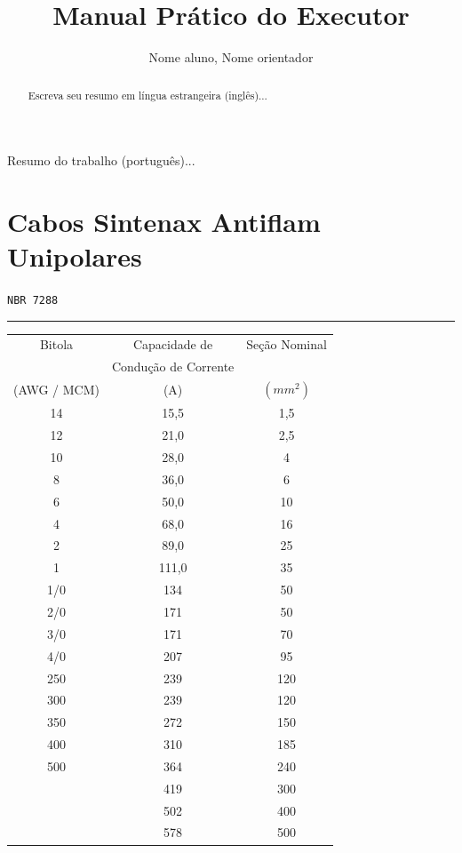\documentclass[12pt]{article}
\title{Manual Prático do Executor} %
\author{Nome aluno\inst{1}, Nome orientador\inst{1}} %
\begin{document}
\maketitle %

\begin{abstract} %
  Escreva seu resumo em língua estrangeira (inglês)...
\end{abstract}
     
\begin{resumo}
  Resumo do trabalho (português)...  
\end{resumo}
\selectfont
\section{Cabos Sintenax Antiflam Unipolares }

\begin{minipage}[t]{\linewidth}\color{blue}
	\centering
	\noindent
	\texttt{NBR 7288}
\end{minipage}
\rule{\linewidth}{.1em}\par
\noindent
\begin{tabular}{|c|c|c|}
	\hline
	Bitola & Capacidade de  & Seção Nominal \\
	 & Condução de Corrente & \\
	(AWG / MCM) & (A) & $(mm^{2})$ \\
	\hline
	14 & 15,5 & 1,5 \\
	\hline
	12 & 21,0 & 2,5 \\
	\hline
	10 & 28,0 & 4 \\
	\hline
	8 & 36,0 & 6 \\
	\hline
	6 & 50,0 & 10 \\
	\hline
	4 & 68,0 & 16 \\
	\hline
	2 & 89,0 & 25 \\
	\hline
	1 & 111,0 & 35 \\
	\hline
	1/0 & 134 & 50 \\
	\hline
	2/0 & 171 & 50 \\
	\hline
	3/0 & 171 & 70 \\
	\hline
	4/0 & 207 & 95 \\
	\hline
	250 & 239 & 120 \\
	\hline
	300 & 239 & 120 \\
	\hline
	350 & 272 & 150 \\
	\hline
	400 & 310 & 185 \\
	\hline
	500 & 364 & 240 \\
	\hline
	& 419 & 300 \\
	\hline
	& 502 & 400 \\
	\hline
	& 578 & 500 \\
	\hline
\end{tabular}
\end{document}
